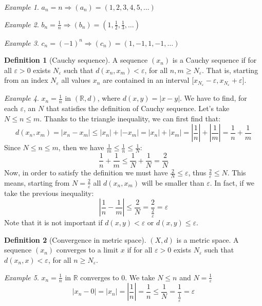 \documentclass{article}
\newcommand{\abs}[1]{\left|#1\right|}
\newcommand{\Ar}{\Rightarrow}
\newcommand{\fr}[2]{\frac{#1}{#2}}
\theoremstyle{definition}
\newtheorem{definition}{Definition}[section]
\theoremstyle{definition}
\theoremstyle{plain}
\theoremstyle{plain}
\theoremstyle{plain}
\theoremstyle{plain}
\theoremstyle{definition}
\theoremstyle{remark}
\newtheorem{exampled}{Example}[definition]
\theoremstyle{remark}
\theoremstyle{remark}
\theoremstyle{remark}
\newcommand{\R}{\mathbb{R}}
\newcommand{\E}{\varepsilon}
\begin{document}
\begin{exampled}
  $a_n = n \Ar (a_n) = (1, 2, 3, 4, 5, \hdots)$
\end{exampled}

\begin{exampled}
  $b_n = \fr{1}{n} \Ar (b_n) = (1, \fr{1}{2}, \fr{1}{3}, \hdots)$
\end{exampled}

\begin{exampled}
  $c_n = (-1)^n \Ar (c_n) = (1, -1, 1, -1, \hdots)$
\end{exampled}


\begin{definition}[Cauchy sequence]
  A sequence $(x_n)$ is a Cauchy sequence if for all $\E > 0$ exists $N_\E$ such that $d(x_n,x_m) < \E$, for all $n, m \geq N_\E$. That is, starting from an index $N_\E$ all values $x_n$ are contained in an interval ${[}x_{N_\E} - \E, x_{N_\E} + \E{]}$.
\end{definition}

\begin{exampled}
  $x_n = \fr{1}{n}$ in $(\R, d)$, where $d(x,y) = \abs{x - y}$. We have to find, for each $\E$, an $N$ that satisfies the definition of Cauchy sequence. Let's take $N \leq n \leq m$. Thanks to the triangle inequality, we can first find that:
  \[
  d(x_n,x_m) = \abs{x_n - x_m} \leq \abs{x_n} + \abs{-x_m} =
  \abs{x_n} + \abs{x_m} = \abs{\fr{1}{n}} + \abs{\fr{1}{m}} =
  \fr{1}{n} + \fr{1}{m}
  \]
  Since $N \leq n \leq m$, then we have $\fr{1}{m} \leq \fr{1}{n} \leq \fr{1}{N}$:
  \[
  \fr{1}{n} + \fr{1}{m} \leq
  \fr{1}{N} + \fr{1}{N} = \fr{2}{N}
  \]
  Now, in order to satisfy the definition we must have $\fr{2}{N} \leq \E$, thus $\fr{2}{\E} \leq N$. This means, starting from $N = \fr{2}{\E}$ all $d(x_n,x_m)$ will be smaller than $\E$. In fact, if we take the previous inequality:
  \[
  \abs{\fr{1}{n} - \fr{1}{m}} \leq
  \fr{2}{N} = \fr{2}{\fr{2}{\E}} = \E
  \]
  Note that it is not important if $d(x,y) < \E$ or $d(x,y) \leq \E$.
\end{exampled}


\begin{definition}[Convergence in metric space]
  $(X, d)$ is a metric space. A sequence $(x_n)$ converges to a limit $x$ if for all $\E > 0$ exists $N_\E$ such that $d(x_n,x) < \E$, for all $n \geq N_\E$.
\end{definition}

\begin{exampled}
  $x_n = \frac{1}{n}$ in $\R$ converges to 0. We take $N \leq n$ and $N = \frac{1}{\E}$
  \[
  \abs{x_n - 0} =
  \abs{x_n} =
  \abs{\frac{1}{n}} =
  \frac{1}{n} \leq
  \frac{1}{N} =
  \frac{1}{\frac{1}{\E}} =
  \E
  \]
\end{exampled}
\end{document}
